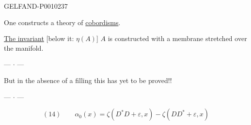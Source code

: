 \begin{GelfandAdjacentEvidence}{GELFAND-P001023}{7}


One constructs a theory of \underline{cobordisms}.

\underline{The invariant} [below it: $\eta(A)$] $A$ is constructed with a membrane stretched over the manifold.
\end{GelfandAdjacentEvidence}


\begin{center}--- $\cdot$ ---\end{center}

But in the absence of a filling this has yet to be proved!!

\begin{center}--- $\cdot$ ---\end{center}

\[
(14)\qquad \alpha_0(x)=\zeta(D^*D+\varepsilon,x)-\zeta(DD^*+\varepsilon,x)
\]


